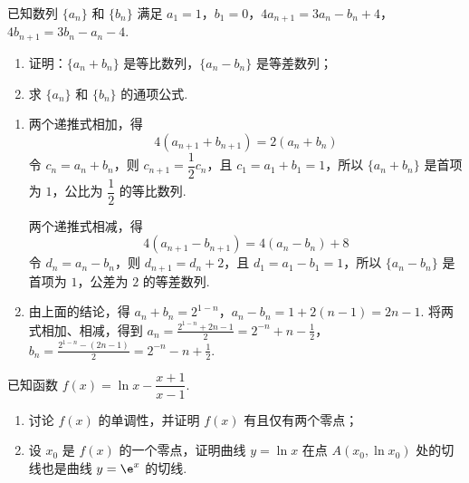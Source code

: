 \begin{problem}
已知数列 \(\{a_n\}\) 和 \(\{b_n\}\) 满足 \(a_1=1\)，\(b_1=0\)，\(4a_{n+1}=3a_n-b_n+4\)，\(4b_{n+1}=3b_n-a_n-4\).

\begin{enumerate}
\item 证明：\(\{a_n+b_n\}\) 是等比数列，\(\{a_n-b_n\}\) 是等差数列；
\item 求 \(\{a_n\}\) 和 \(\{b_n\}\) 的通项公式.
\end{enumerate}
\end{problem}

\begin{solution}
\begin{enumerate}
\item 两个递推式相加，得
\[
4(a_{n+1}+b_{n+1})=2(a_n+b_n)
\]
令 \(c_n=a_n+b_n\)，则 \(c_{n+1}=\dfrac12c_n\)，且 \(c_1=a_1+b_1=1\)，所以 \(\{a_n+b_n\}\) 是首项为 \(1\)，公比为 \(\dfrac12\) 的等比数列.

两个递推式相减，得
\[
4(a_{n+1}-b_{n+1})=4(a_n-b_n)+8
\]
令 \(d_n=a_n-b_n\)，则 \(d_{n+1}=d_n+2\)，且 \(d_1=a_1-b_1=1\)，所以 \(\{a_n-b_n\}\) 是首项为 \(1\)，公差为 \(2\) 的等差数列.

\item 由上面的结论，得
\(a_n+b_n=2^{1-n}\)，\(a_n-b_n=1+2(n-1)=2n-1\).
将两式相加、相减，得到
\(a_n=\frac{2^{1-n}+2n-1}{2}=2^{-n}+n-\frac12\)，\(b_n=\frac{2^{1-n}-(2n-1)}{2}=2^{-n}-n+\frac12\).
\end{enumerate}
\end{solution}

\begin{problem}
已知函数 \(f(x)=\ln x-\dfrac{x+1}{x-1}\).

\begin{enumerate}
\item 讨论 \(f(x)\) 的单调性，并证明 \(f(x)\) 有且仅有两个零点；
\item 设 \(x_0\) 是 \(f(x)\) 的一个零点，证明曲线 \(y=\ln x\) 在点 \(A(x_0,\ln x_0)\) 处的切线也是曲线 \(y=\e^x\) 的切线.
\end{enumerate}
\end{problem}


